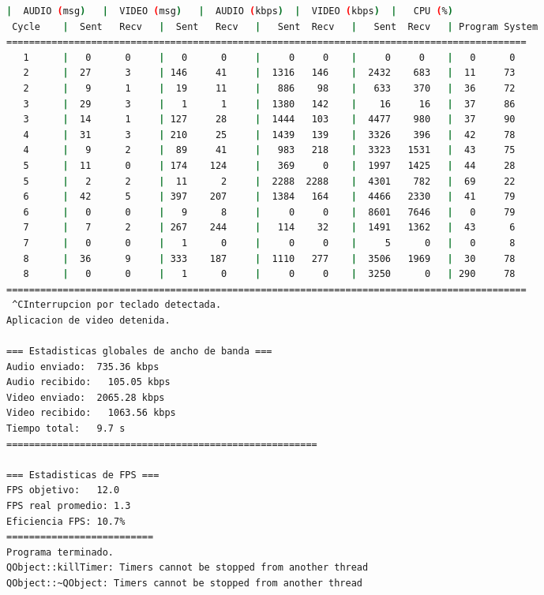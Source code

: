 \begin{adjustbox}{max width=\textwidth}
\begin{lstlisting}[language=bash,basicstyle=\ttfamily\scriptsize]
          |  AUDIO (msg)   |  VIDEO (msg)   |  AUDIO (kbps)  |  VIDEO (kbps)  |   CPU (%)
 Cycle    |  Sent   Recv   |  Sent   Recv   |   Sent  Recv   |   Sent  Recv   | Program System
============================================================================================
   1      |   0      0     |   0      0     |     0     0    |     0     0    |   0      0
   2      |  27      3     | 146     41     |  1316   146    |  2432    683   |  11     73
   2      |   9      1     |  19     11     |   886    98    |   633    370   |  36     72
   3      |  29      3     |   1      1     |  1380   142    |    16     16   |  37     86
   3      |  14      1     | 127     28     |  1444   103    |  4477    980   |  37     90
   4      |  31      3     | 210     25     |  1439   139    |  3326    396   |  42     78
   4      |   9      2     |  89     41     |   983   218    |  3323   1531   |  43     75
   5      |  11      0     | 174    124     |   369     0    |  1997   1425   |  44     28
   5      |   2      2     |  11      2     |  2288  2288    |  4301    782   |  69     22
   6      |  42      5     | 397    207     |  1384   164    |  4466   2330   |  41     79
   6      |   0      0     |   9      8     |     0     0    |  8601   7646   |   0     79
   7      |   7      2     | 267    244     |   114    32    |  1491   1362   |  43      6
   7      |   0      0     |   1      0     |     0     0    |     5      0   |   0      8
   8      |  36      9     | 333    187     |  1110   277    |  3506   1969   |  30     78
   8      |   0      0     |   1      0     |     0     0    |  3250      0   | 290     78
============================================================================================
 ^CInterrupcion por teclado detectada.
Aplicacion de video detenida.

=== Estadisticas globales de ancho de banda ===
Audio enviado:	735.36 kbps
Audio recibido:   105.05 kbps
Video enviado:	2065.28 kbps
Video recibido:   1063.56 kbps
Tiempo total: 	9.7 s
=======================================================

=== Estadisticas de FPS ===
FPS objetivo: 	12.0
FPS real promedio: 1.3
Eficiencia FPS:	10.7%
==========================
Programa terminado.
QObject::killTimer: Timers cannot be stopped from another thread
QObject::~QObject: Timers cannot be stopped from another thread
\end{lstlisting}
\end{adjustbox}
\vspace{\baselineskip}

